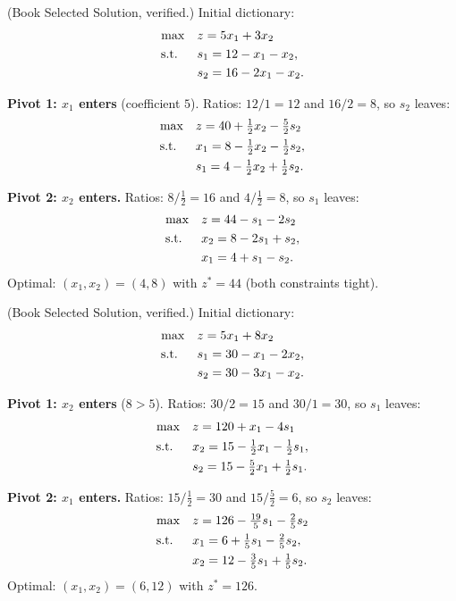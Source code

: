 
(Book Selected Solution, verified.) Initial dictionary:
\[
\begin{aligned}
\max\quad & z = 5x_1 + 3x_2 \\
\text{s.t.}\;\;\quad & s_1 = 12 - x_1 - x_2, \\
& s_2 = 16 - 2x_1 - x_2.
\end{aligned}
\]

\textbf{Pivot 1: $x_1$ enters} (coefficient $5$). Ratios: $12/1 = 12$ and
$16/2 = 8$, so $s_2$ leaves:
\[
\begin{aligned}
\max\quad & z = 40 + \tfrac12 x_2 - \tfrac52 s_2 \\
\text{s.t.}\;\;\quad & x_1 = 8 - \tfrac12 x_2 - \tfrac12 s_2, \\
& s_1 = 4 - \tfrac12 x_2 + \tfrac12 s_2.
\end{aligned}
\]

\textbf{Pivot 2: $x_2$ enters.} Ratios: $8/\tfrac12 = 16$ and
$4/\tfrac12 = 8$, so $s_1$ leaves:
\[
\begin{aligned}
\max\quad & z = 44 - s_1 - 2s_2 \\
\text{s.t.}\;\;\quad & x_2 = 8 - 2s_1 + s_2, \\
& x_1 = 4 + s_1 - s_2.
\end{aligned}
\]
Optimal: $(x_1, x_2) = (4, 8)$ with $z^* = 44$ (both constraints tight).


(Book Selected Solution, verified.) Initial dictionary:
\[
\begin{aligned}
\max\quad & z = 5x_1 + 8x_2 \\
\text{s.t.}\;\;\quad & s_1 = 30 - x_1 - 2x_2, \\
& s_2 = 30 - 3x_1 - x_2.
\end{aligned}
\]

\textbf{Pivot 1: $x_2$ enters} ($8 > 5$). Ratios: $30/2 = 15$ and
$30/1 = 30$, so $s_1$ leaves:
\[
\begin{aligned}
\max\quad & z = 120 + x_1 - 4s_1 \\
\text{s.t.}\;\;\quad & x_2 = 15 - \tfrac12 x_1 - \tfrac12 s_1, \\
& s_2 = 15 - \tfrac52 x_1 + \tfrac12 s_1.
\end{aligned}
\]

\textbf{Pivot 2: $x_1$ enters.} Ratios: $15/\tfrac12 = 30$ and
$15/\tfrac52 = 6$, so $s_2$ leaves:
\[
\begin{aligned}
\max\quad & z = 126 - \tfrac{19}{5} s_1 - \tfrac25 s_2 \\
\text{s.t.}\;\;\quad & x_1 = 6 + \tfrac15 s_1 - \tfrac25 s_2, \\
& x_2 = 12 - \tfrac35 s_1 + \tfrac15 s_2.
\end{aligned}
\]
Optimal: $(x_1, x_2) = (6, 12)$ with $z^* = 126$.


